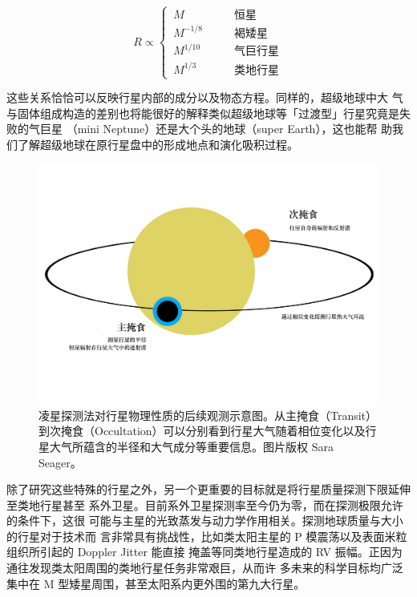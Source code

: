\begin{equation} \label{eq:massrad}
R \propto \left\{
  \begin{array}{lr}
       \,   M            &  \qquad \text{恒星} 	   \\
       \,   M^{-1/8}  &  \qquad \text{褐矮星} 	   \\
       \,   M^{1/10} &  \qquad \text{气巨行星}   \\
       \,   M^{1/3}   &  \qquad \text{类地行星} 
  \end{array}
\right.
\end{equation} 

这些关系恰恰可以反映行星内部的成分以及物态方程\cite{Zapolsky1969}。同样的，超级地球中大
气与固体组成构造的差别也将能很好的解释类似超级地球等「过渡型」行星究竟是失败的气巨星
（mini Neptune）还是大个头的地球\cite{Rogers2015a,Lissauer2014}（super Earth），这也能帮
助我们了解超级地球在原行星盘中的形成地点和演化吸积过程\cite{Miguel2011,Haghighipour2013}。

\begin{figure}[t]
\centering
\includegraphics[width=1.0\textwidth]{figures/chapter5/fig1_eclipsing.pdf}
\caption{凌星探测法对行星物理性质的后续观测示意图。从主掩食（Transit）到次掩食（Occultation）可以分别看到行星大气随着相位变化以及行星大气所蕴含的半径和大气成分等重要信息。图片版权 Sara Seager。}
\label{fig:transitspectro}
\end{figure}


除了研究这些特殊的行星之外，另一个更重要的目标就是将行星质量探测下限延伸至类地行星甚至
系外卫星。目前系外卫星探测率至今仍为零\cite{Kipping2011}，而在探测极限允许的条件下，这很
可能与主星的光致蒸发与动力学作用相关\cite{Yang2016}。探测地球质量与大小的行星对于技术而
言非常具有挑战性，比如类太阳主星的 P 模震荡以及表面米粒组织所引起的 Doppler Jitter 能直接
掩盖等同类地行星造成的 RV 振幅。正因为通往发现类太阳周围的类地行星任务非常艰巨，从而许
多未来的科学目标均广泛集中在 M 型矮星周围，甚至太阳系内更外围的第九大行星\cite{Batygin2016a}。


